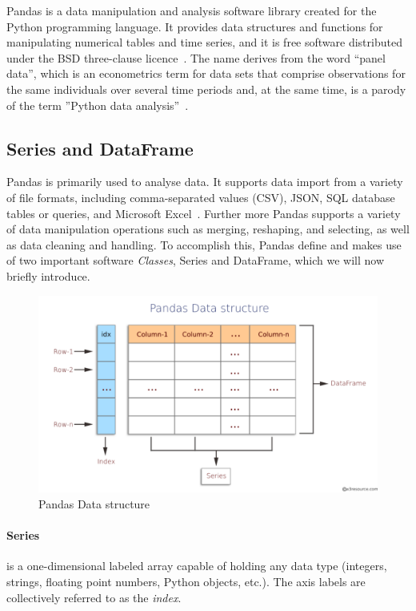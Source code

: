 Pandas is a data manipulation and analysis software library created for the Python programming language. It provides data structures and functions for manipulating numerical tables and time series, and it is free software distributed under the BSD three-clause licence~\cite{Misc:OpenLDAP_license:oldap-2.7}.
The name derives from the word ``panel data'', which is an econometrics term for data sets that comprise observations for the same individuals over several time periods and, at the same time, is a parody of the term ''Python data analysis''~\cite{mckinney_data_2010}.

\subsection{Series and DataFrame}

Pandas is primarily used to analyse data. It supports data import from a variety of file formats, including comma-separated values (CSV), JSON, SQL database tables or queries, and Microsoft Excel~\cite{Misc:pandas_docs}.
Further more Pandas supports a variety of data manipulation operations such as merging, reshaping, and selecting, as well as data cleaning and handling.
To accomplish this, Pandas define and makes use of two important software \textit{Classes}, Series and DataFrame, which we will now briefly introduce.
\begin{figure}[ht]
    \centering
    \includegraphics[width=\linewidth]{content/chapter_3/images/datastructure.pdf}
    \caption{Pandas Data structure}
    \label{fig:pandas_dataframe}
\end{figure}
\paragraph{Series} is a one-dimensional labeled array capable of holding any data type (integers, strings, floating point numbers, Python objects, etc.). The axis labels are collectively referred to as the \textit{index}.

